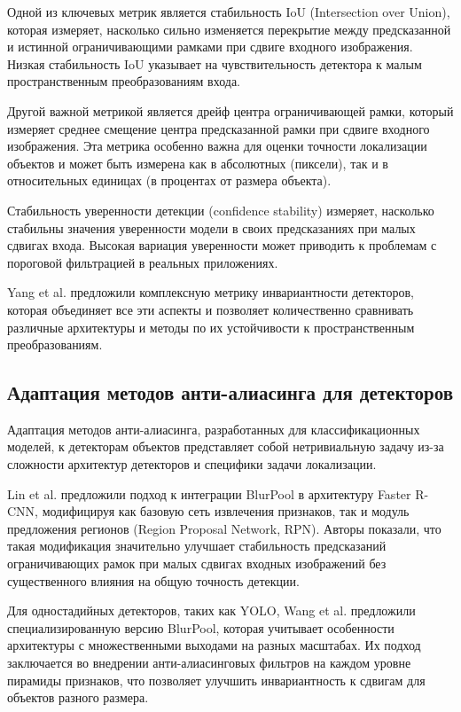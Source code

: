 Одной из ключевых метрик является стабильность IoU (Intersection over Union), которая измеряет, насколько сильно изменяется перекрытие между предсказанной и истинной ограничивающими рамками при сдвиге входного изображения. Низкая стабильность IoU указывает на чувствительность детектора к малым пространственным преобразованиям входа.

Другой важной метрикой является дрейф центра ограничивающей рамки, который измеряет среднее смещение центра предсказанной рамки при сдвиге входного изображения. Эта метрика особенно важна для оценки точности локализации объектов и может быть измерена как в абсолютных (пиксели), так и в относительных единицах (в процентах от размера объекта).

Стабильность уверенности детекции (confidence stability) измеряет, насколько стабильны значения уверенности модели в своих предсказаниях при малых сдвигах входа. Высокая вариация уверенности может приводить к проблемам с пороговой фильтрацией в реальных приложениях.

Yang et al. \cite{Yang2022} предложили комплексную метрику инвариантности детекторов, которая объединяет все эти аспекты и позволяет количественно сравнивать различные архитектуры и методы по их устойчивости к пространственным преобразованиям.

\subsection{Адаптация методов анти-алиасинга для детекторов}
\label{review:detectors:adaptation}

Адаптация методов анти-алиасинга, разработанных для классификационных моделей, к детекторам объектов представляет собой нетривиальную задачу из-за сложности архитектур детекторов и специфики задачи локализации.

Lin et al. \cite{Lin2020} предложили подход к интеграции BlurPool в архитектуру Faster R-CNN, модифицируя как базовую сеть извлечения признаков, так и модуль предложения регионов (Region Proposal Network, RPN). Авторы показали, что такая модификация значительно улучшает стабильность предсказаний ограничивающих рамок при малых сдвигах входных изображений без существенного влияния на общую точность детекции.

Для одностадийных детекторов, таких как YOLO, Wang et al. \cite{Wang2020} предложили специализированную версию BlurPool, которая учитывает особенности архитектуры с множественными выходами на разных масштабах. Их подход заключается во внедрении анти-алиасинговых фильтров на каждом уровне пирамиды признаков, что позволяет улучшить инвариантность к сдвигам для объектов разного размера.

